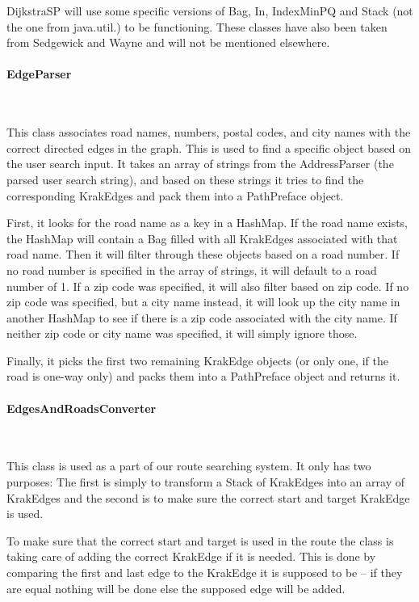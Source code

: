 \documentclass[a4paper,10pt,titlepage]{article}
\begin{document}
DijkstraSP will use some specific versions of Bag\cite{sedgewickAndWayneBag}, In\cite{sedgewickAndWayneIn}, IndexMinPQ\cite{sedgewickAndWayneIndexMinPQ} and Stack\cite{sedgewickAndWayneStack} (not the one from java.util.) to be functioning. These classes have also been taken from Sedgewick and Wayne and will not be mentioned elsewhere.
				
				\paragraph{EdgeParser}\mbox{}\
				
This class associates road names, numbers, postal codes, and city names with the correct directed edges in the graph. This is used to find a specific object based on the user search input. It takes an array of strings from the AddressParser (the parsed user search string), and based on these strings it tries to find the corresponding KrakEdges and pack them into a PathPreface object.

First, it looks for the road name as a key in a HashMap. If the road name exists, the HashMap will contain a Bag filled with all KrakEdges associated with that road name. Then it will filter through these objects based on a road number. If no road number is specified in the array of strings, it will default to a road number of 1. If a zip code was specified, it will also filter based on zip code. If no zip code was specified, but a city name instead, it will look up the city name in another HashMap to see if there is a zip code associated with the city name. If neither zip code or city name was specified, it will simply ignore those.

Finally, it picks the first two remaining KrakEdge objects (or only one, if the road is one-way only) and packs them into a PathPreface object and returns it.\
				
				\paragraph{EdgesAndRoadsConverter}\mbox{}\
				
This class is used as a part of our route searching system. It only has two purposes: The first is simply to transform a Stack of KrakEdges into an array of KrakEdges and the second is to make sure the correct start and target KrakEdge is used.

To make sure that the correct start and target is used in the route the class is taking care of adding the correct KrakEdge if it is needed. This is done by comparing the first and last edge to the KrakEdge it is supposed to be – if they are equal nothing will be done else the supposed edge will be added.
\end{document}
